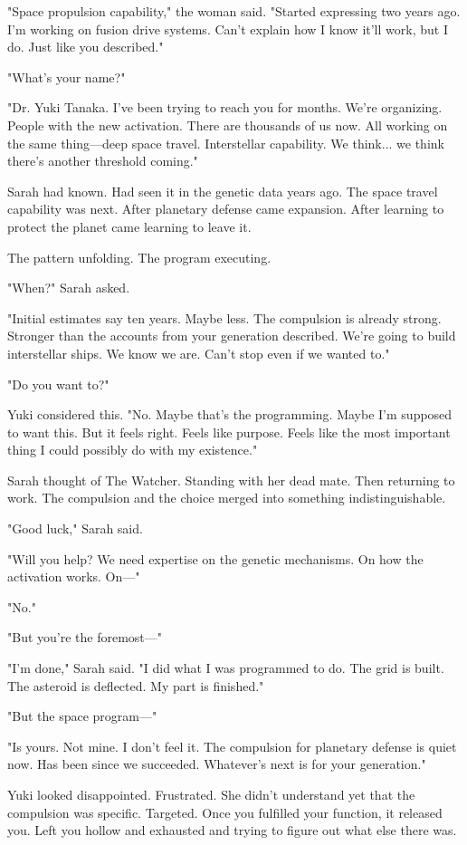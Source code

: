 "Space propulsion capability," the woman said. "Started expressing two years ago. I'm working on fusion drive systems. Can't explain how I know it'll work, but I do. Just like you described."

"What's your name?"

"Dr. Yuki Tanaka. I've been trying to reach you for months. We're organizing. People with the new activation. There are thousands of us now. All working on the same thing—deep space travel. Interstellar capability. We think... we think there's another threshold coming."

Sarah had known. Had seen it in the genetic data years ago. The space travel capability was next. After planetary defense came expansion. After learning to protect the planet came learning to leave it.

The pattern unfolding. The program executing.

"When?" Sarah asked.

"Initial estimates say ten years. Maybe less. The compulsion is already strong. Stronger than the accounts from your generation described. We're going to build interstellar ships. We know we are. Can't stop even if we wanted to."

"Do you want to?"

Yuki considered this. "No. Maybe that's the programming. Maybe I'm supposed to want this. But it feels right. Feels like purpose. Feels like the most important thing I could possibly do with my existence."

Sarah thought of The Watcher. Standing with her dead mate. Then returning to work. The compulsion and the choice merged into something indistinguishable.

"Good luck," Sarah said.

"Will you help? We need expertise on the genetic mechanisms. On how the activation works. On—"

"No."

"But you're the foremost—"

"I'm done," Sarah said. "I did what I was programmed to do. The grid is built. The asteroid is deflected. My part is finished."

"But the space program—"

"Is yours. Not mine. I don't feel it. The compulsion for planetary defense is quiet now. Has been since we succeeded. Whatever's next is for your generation."

Yuki looked disappointed. Frustrated. She didn't understand yet that the compulsion was specific. Targeted. Once you fulfilled your function, it released you. Left you hollow and exhausted and trying to figure out what else there was.

